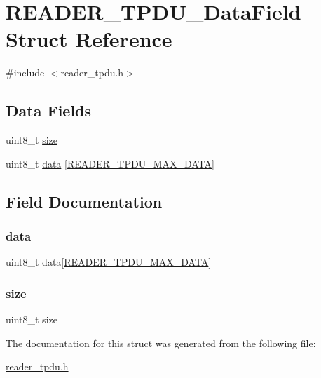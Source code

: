 \hypertarget{struct_r_e_a_d_e_r___t_p_d_u___data_field}{}\section{R\+E\+A\+D\+E\+R\+\_\+\+T\+P\+D\+U\+\_\+\+Data\+Field Struct Reference}
\label{struct_r_e_a_d_e_r___t_p_d_u___data_field}


{\ttfamily \#include $<$reader\+\_\+tpdu.\+h$>$}

\subsection*{Data Fields}
\begin{DoxyCompactItemize}
\item 
uint8\+\_\+t \hyperlink{struct_r_e_a_d_e_r___t_p_d_u___data_field_ae5dc6ffcd9b7605c7787791e40cc6bb0}{size}
\item 
uint8\+\_\+t \hyperlink{struct_r_e_a_d_e_r___t_p_d_u___data_field_ab535cce6473e21eec0352b98db13a53c}{data} \mbox{[}\hyperlink{reader__tpdu_8h_ac2b5682646f650db380874cab59e3e00}{R\+E\+A\+D\+E\+R\+\_\+\+T\+P\+D\+U\+\_\+\+M\+A\+X\+\_\+\+D\+A\+TA}\mbox{]}
\end{DoxyCompactItemize}


\subsection{Field Documentation}
\mbox{\label{struct_r_e_a_d_e_r___t_p_d_u___data_field_ab535cce6473e21eec0352b98db13a53c}} 
\subsubsection{\texorpdfstring{data}{data}}
{\footnotesize\ttfamily uint8\+\_\+t data\mbox{[}\hyperlink{reader__tpdu_8h_ac2b5682646f650db380874cab59e3e00}{R\+E\+A\+D\+E\+R\+\_\+\+T\+P\+D\+U\+\_\+\+M\+A\+X\+\_\+\+D\+A\+TA}\mbox{]}}

\mbox{\label{struct_r_e_a_d_e_r___t_p_d_u___data_field_ae5dc6ffcd9b7605c7787791e40cc6bb0}} 
\subsubsection{\texorpdfstring{size}{size}}
{\footnotesize\ttfamily uint8\+\_\+t size}



The documentation for this struct was generated from the following file\+:\begin{DoxyCompactItemize}
\item 
\hyperlink{reader__tpdu_8h}{reader\+\_\+tpdu.\+h}\end{DoxyCompactItemize}

